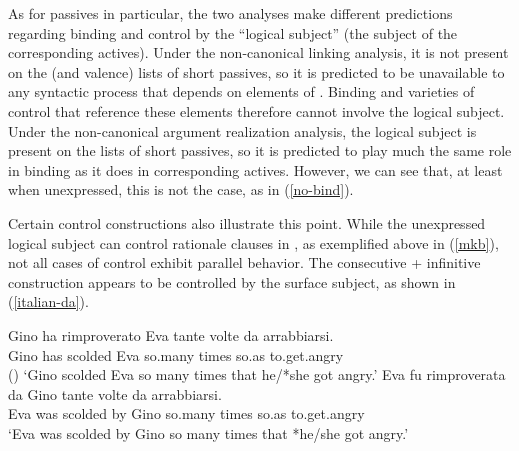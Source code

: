 \documentclass[output=paper,biblatex,babelshorthands,newtxmath,draftmode,colorlinks, citecolor=brown]{langscibook}
\begin{document}
\largerpage
As for passives in particular, the two analyses make different predictions regarding binding and
control by the ``logical subject'' (the subject of the corresponding actives).  Under the
non-canonical linking analysis, it is not present on the \argst (and valence) lists of short
passives, so it is predicted to be unavailable to any syntactic process that depends on elements of
\argst.  Binding and varieties of control that reference these elements therefore cannot involve the
logical subject.  Under the non-canonical argument realization analysis, the logical subject is
present on the \argst lists of short passives, so it is predicted to play much the same role in
binding as it does in corresponding actives.  However, we can see that, at least when unexpressed,
this is not the case, as in (\ref{no-bind}).
\begin{exe}
\end{exe}

Certain control constructions also illustrate this point.
While the unexpressed logical subject can control rationale clauses in , as exemplified above in (\ref{mkb}), not all cases of control exhibit parallel behavior.
The  consecutive  + infinitive construction \citep{Perlmutter1984, Sanfilippo1998} appears to be controlled by the surface subject, as shown in (\ref{italian-da}).


\begin{exe}
\ex     \label{italian-da}
\begin{xlist}
\ex
\gll Gino ha  rimproverato Eva tante   volte da    arrabbiarsi.  \\
     Gino has scolded      Eva so.many times so.as to.get.angry  \\\hfill()
\glt `Gino scolded Eva so many times that he/*she got angry.'
\ex
\gll Eva fu  rimproverata da Gino tante   volte da    arrabbiarsi.  \\
     Eva was scolded      by Gino so.many times so.as to.get.angry  \\
\glt `Eva was scolded by Gino so many times that *he/she got angry.'
\end{xlist}
\end{exe}
\end{document}
